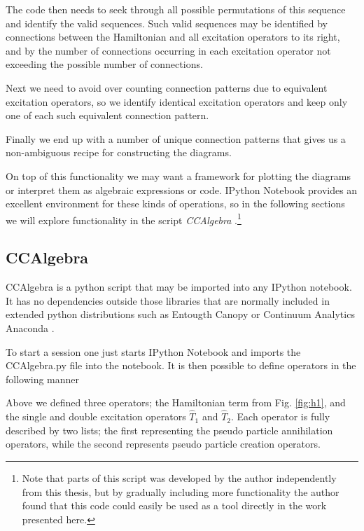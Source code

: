 The code then needs to seek through all possible permutations of this
sequence and identify the valid sequences. Such valid sequences may be
identified by connections between the Hamiltonian and all excitation
operators to its right, and by the number of connections occurring in
each excitation operator not exceeding the possible number of
connections.

Next we need to avoid over counting connection patterns due to
equivalent excitation operators, so we identify identical excitation
operators and keep only one of each such equivalent connection
pattern.

Finally we end up with a number of unique connection patterns that
gives us a non-ambiguous recipe for constructing the diagrams.

On top of this functionality we may want a framework for plotting the
diagrams or interpret them as algebraic expressions or code. IPython
Notebook \cite{ipython} provides an excellent environment for these
kinds of operations, so in the following sections we will explore
functionality in the script \emph{CCAlgebra} \cite{CCAlgebra}.\footnote{Note that parts of this script was developed by the author independently from this thesis, but by gradually including more functionality the author found that this code could easily be used as a tool directly in the work presented here.}

\subsection{CCAlgebra}

CCAlgebra is a python script that may be imported into any IPython
notebook. It has no dependencies outside those libraries that are
normally included in extended python distributions such as Entougth
Canopy \cite{Entought} or Continuum Analytics Anaconda
\cite{Anaconda}.

To start a session one just starts IPython Notebook and imports the
CCAlgebra.py file into the notebook.
It is then possible to define operators in the following manner

\begin{minipage}{\linewidth}
\end{minipage}

Above we defined three operators; the Hamiltonian term from Fig.
\ref{fig:h1}, and the single and double excitation operators
$\hat{T}_1$ and $\hat{T}_2$. Each operator is fully described by two
lists; the first representing the pseudo particle annihilation
operators, while the second represents pseudo particle creation
operators.

